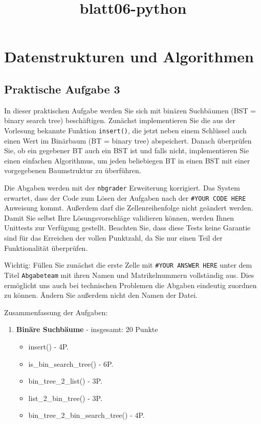 \documentclass[11pt]{article}
\title{blatt06-python}
\providecommand{\tightlist}{%
      \setlength{\itemsep}{0pt}\setlength{\parskip}{0pt}}
\begin{document}
    
    \maketitle
    
    

    
    \hypertarget{datenstrukturen-und-algorithmen}{%
\section{Datenstrukturen und
Algorithmen}\label{datenstrukturen-und-algorithmen}}

\hypertarget{praktische-aufgabe-3}{%
\subsection{Praktische Aufgabe 3}\label{praktische-aufgabe-3}}

In dieser praktischen Aufgabe werden Sie sich mit binären Suchbäumen
(BST = binary search tree) beschäftigen. Zunächst implementieren Sie die
aus der Vorlesung bekannte Funktion \texttt{insert()}, die jetzt neben
einem Schlüssel auch einen Wert im Binärbaum (BT = binary tree)
abspeichert. Danach überprüfen Sie, ob ein gegebener BT auch ein BST ist
und falls nicht, implementieren Sie einen einfachen Algorithmus, um
jeden beliebiegen BT in einen BST mit einer vorgegebenen Baumstruktur zu
überführen.

Die Abgaben werden mit der \texttt{nbgrader} Erweiterung korrigiert. Das
System erwartet, dass der Code zum Lösen der Aufgaben nach der
\texttt{\#YOUR\ CODE\ HERE} Anweisung kommt. Außerdem darf die
Zellenreihenfolge nicht geändert werden. Damit Sie selbst Ihre
Lösungsvorschläge validieren können, werden Ihnen Unittests zur
Verfügung gestellt. Beachten Sie, dass diese Tests keine Garantie sind
für das Erreichen der vollen Punktzahl, da Sie nur einen Teil der
Funktionalität überprüfen.

Wichtig: Füllen Sie zunächst die erste Zelle mit
\texttt{\#YOUR\ ANSWER\ HERE} unter dem Titel \texttt{Abgabeteam} mit
ihren Namen und Matrikelnummern vollständig aus. Dies ermöglicht uns
auch bei technischen Problemen die Abgaben eindeutig zuordnen zu können.
Ändern Sie außerdem nicht den Namen der Datei.

Zusammenfassung der Aufgaben:

\begin{enumerate}
\def\labelenumi{\arabic{enumi}.}
\tightlist
\item
  \textbf{Binäre Suchbäume} - insgesamt: 20 Punkte

  \begin{itemize}
  \tightlist
  \item
    insert() - 4P.
  \item
    is\_bin\_search\_tree() - 6P.
  \item
    bin\_tree\_2\_list() - 3P.
  \item
    list\_2\_bin\_tree() - 3P.
  \item
    bin\_tree\_2\_bin\_search\_tree() - 4P.
  \end{itemize}
\end{enumerate}
\end{document}
